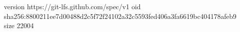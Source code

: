 version https://git-lfs.github.com/spec/v1
oid sha256:8800211ee7d00488d2c5f72f24102a32c5593fed406a3fa6619bc404178afeb9
size 22004
